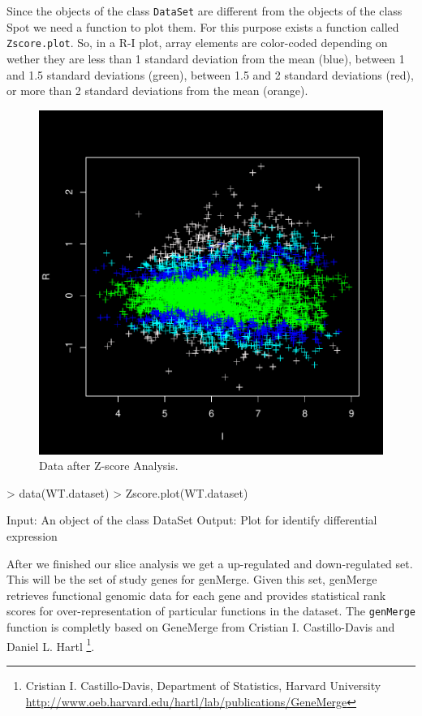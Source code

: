 \documentclass[12pt]{article}
\begin{document}
Since the objects of the class \texttt{DataSet} are different from the objects of the class Spot we need a function to plot them. For this purpose exists a function called \texttt{Zscore.plot}. So, in a R-I plot, array elements are color-coded depending on wether they are less than 1 standard deviation from the mean (blue), between 1 and 1.5 standard deviations (green), between 1.5 and 2 standard deviations (red), or more than 2 standard deviations from the mean (orange).
\begin{figure}[h]
\begin{center}
\includegraphics{example-genArise-016}
\caption{Data after Z-score Analysis. \label{fig14}}
\end{center}
\end{figure}
\begin{Scode}
> data(WT.dataset)
> Zscore.plot(WT.dataset)
\end{Scode}

\begin{Soutput}
Input: An object of the class DataSet
Output: Plot for identify differential expression
\end{Soutput}

After we finished our slice analysis we get a up-regulated and down-regulated set. This will be the set of study genes for genMerge. Given this set, genMerge retrieves functional genomic data for each gene and provides statistical rank scores for over-representation of particular functions in the dataset. The \texttt{genMerge} function is completly based on GeneMerge from Cristian I. Castillo-Davis and Daniel L. Hartl \footnote[3]{Cristian I. Castillo-Davis, Department of Statistics, Harvard University \url{http://www.oeb.harvard.edu/hartl/lab/publications/GeneMerge}
}.\\
\end{document}
